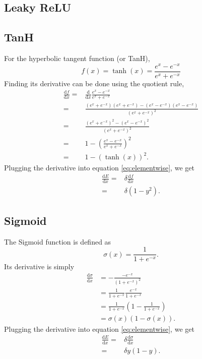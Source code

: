 \documentclass[a4paper]{article}
\begin{document}
\subsection{Leaky ReLU}
\subsection{TanH}
For the hyperbolic tangent function (or TanH), 
\begin{equation}
f(x)=\tanh(x)=\frac{e^{x}-e^{-x}}{e^{x}+e^{-x}}
\end{equation}
Finding its derivative can be done using the quotient rule,
\begin{align}
\frac{\mathrm{d}f}{\mathrm{d}x}
= & \frac{\mathrm{d}}{\mathrm{d}x}\frac{e^{x}-e^{-x}}{e^{x}+e^{-x}}\\
= & \frac{(e^{x}+e^{-x})(e^{x}+e^{-x})-(e^{x}-e^{-x})(e^{x}-e^{-x})}{(e^{x}+e^{-x})^2}\\
= & \frac{(e^{x}+e^{-x})^{2}-(e^{x}-e^{-x})^{2}}{(e^{x}+e^{-x})^2}\\
= & 1 - \left ( \frac{e^{x}-e^{-x}}{e^{x}+e^{-x}} \right )^{2}\\
= & 1 - \left( \tanh(x) \right)^{2}.
\end{align}
Plugging the derivative into equation \ref{eq:elementwise}, we get
\begin{align}
\frac{\mathrm{d} E }{\mathrm{d} x}= &\delta \frac{\mathrm{d} f }{\mathrm{d} x} \\
= & \delta \left ( 1-y^{2} \right ).
\end{align}

\subsection{Sigmoid}
The Sigmoid function is defined as
\begin{equation}
\sigma (x)= \frac{1}{1+e^{-x}}.
\end{equation}
Its derivative is simply
\begin{align}
\frac{\mathrm{d} \sigma }{\mathrm{d} x}&= - \frac{-e^{-x}}{\left( 1+e^{-x} \right)^{2}} \\
&= \frac{1}{1+e^{-x}}\frac{e^{-x}}{1+e^{-x}} \\
&= \frac{1}{1+e^{-x}}\left(1-\frac{1}{1+e^{-x}}\right)\\
&= \sigma(x)\left(1-\sigma(x)\right).
\end{align}
Plugging the derivative into equation \ref{eq:elementwise}, we get
\begin{align}
\frac{\mathrm{d} E }{\mathrm{d} x}= &\delta \frac{\mathrm{d} \sigma }{\mathrm{d} x} \\
= & \delta y\left ( 1-y \right ).
\end{align}
\end{document}
